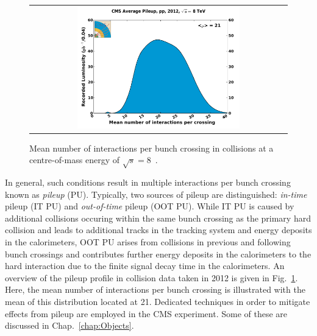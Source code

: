 \begin{figure}[!t]
  \centering
  \begin{tabular}{c}
    \includegraphics[width=0.65\textwidth]{figures/pileup_pp_2012.pdf} 
  \end{tabular}
  \caption{Mean number of interactions per bunch crossing in \pp collisions at a centre-of-mass energy of $\sqrt{s} = 8$\tev~\cite{bib:lhc:lumi12}.}
  \label{fig:lhc_pileup}
\end{figure}
In general, such conditions result in multiple interactions per bunch crossing known as \textit{pileup} (PU). Typically, two sources of pileup are distinguished: \textit{in-time} pileup (IT PU) and \textit{out-of-time} pileup (OOT PU). While IT PU is caused by additional \pp collisions occuring within the same bunch crossing as the primary hard collision and leads to additional tracks in the tracking system and energy deposits in the calorimeters, OOT PU arises from \pp collisions in previous and following bunch crossings and contributes further energy deposits in the calorimeters to the hard interaction due to the finite signal decay time in the calorimeters. An overview of the pileup profile in collision data taken in 2012 is given in Fig.~\ref{fig:lhc_pileup}. Here, the mean number of interactions per bunch crossing is illustrated with the mean of this distribution located at 21. Dedicated techniques in order to mitigate effects from pileup are employed in the CMS experiment. Some of these are discussed in Chap.~\ref{chap:Objects}.






